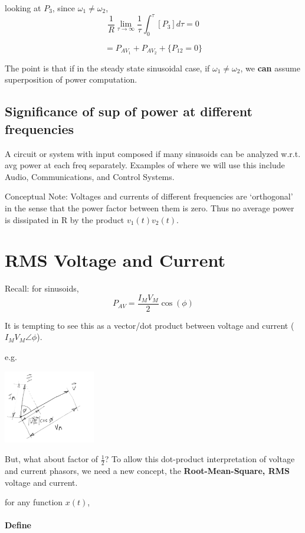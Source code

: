 looking at $P_3$,  since $\omega_1 \neq \omega_2$,
\[
\frac{1}{R} \lim_{\tau \rightarrow \infty} \frac{1}{\tau} \int_0^\tau \left[ P_3 \right ] d\tau = 0
\]

\[
= P_{AV_1} + P_{AV_2} + \{ P_{12} = 0 \}
\]

The point is that if in the steady state sinusoidal case, if $\omega_1 \neq \omega_2$, we {\bf can} assume
superposition of power computation.

\subsection*{Significance of sup of power at different frequencies}

A circuit or system with input composed if many sinusoids can be analyzed w.r.t. avg power at each freq separately.  Examples of where we will use this include Audio, Communications,
and Control Systems.

 Conceptual Note: Voltages and currents of different frequencies are `orthogonal' in the sense that the power factor between them is zero.
 Thus no average power is dissipated in R by the product $v_1(t) v_2(t)$.

\noindent



\section{RMS Voltage and Current}
Recall: for sinusoids,
\[
P_{AV} = \frac{I_M V_M}{2} \cos(\phi)
\]

It is tempting to see this as a vector/dot product between voltage and current ($I_M V_M\angle \phi
$).

e.g.

\includegraphics[width=0.3\textwidth]{figsChapt03/UH48274.png}

But, what about factor of $\frac{1}{2}$?    To allow this dot-product interpretation of
voltage and current phasors, we need a new concept, the {\bf Root-Mean-Square, RMS} voltage
and current.

for any function $x(t)$,

\paragraph{Define}


